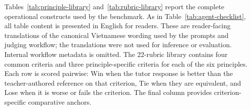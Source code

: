 \documentclass[conference]{IEEEtran}
\begin{document}
Tables~\ref{tab:principle-library} and~\ref{tab:rubric-library} report the
complete operational constructs used by the benchmark. As in
Table~\ref{tab:agent-checklist}, all table content is presented in English for
readers. These are reader-facing translations of the canonical Vietnamese
wording used by the prompts and judging workflow; the translations were not
used for inference or evaluation. Internal workflow metadata is omitted. The
22-rubric library contains four common criteria and three principle-specific
criteria for each of the six principles. Each row is scored pairwise: Win when
the tutor response is better than the teacher-authored reference on that
criterion, Tie when they are equivalent, and Lose when it is worse or fails
the criterion. The final column
provides criterion-specific comparative anchors.
\end{document}
